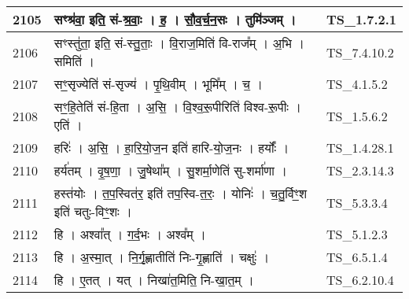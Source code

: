 \documentclass[17pt]{extarticle}
\begin{document}
\begin{longtable}{||p{0.4in}||p{4.9in}||p{0.9in}||}
    \hline
        
    2105 & सꣳश्र॑वा॒ इति॒ सं{-}श्र॒वाः॒   ।   ह॒   ।   सौ॒व॒र्च॒न॒सः   ।   तुमि॑ञ्जम्   ।    & TS\_1.7.2.1       \\
    
    \hline
        
    2106 & सꣳस्तु॑ता॒ इति॒ सं{-}स्तु॒ताः॒   ।   वि॒राज॒मिति॑ वि{-}राज᳚म्   ।   अ॒भि   ।   समिति॑   ।    & TS\_7.4.10.2       \\
    
    \hline
        
    2107 & सꣳ॒॒सृज्येति॑ सं{-}सृज्य॑   ।   पृ॒थि॒वीम्   ।   भूमि᳚म्   ।   च॒   ।    & TS\_4.1.5.2       \\
    
    \hline
        
    2108 & सꣳ॒॒हि॒तेति॑ सं{-}हि॒ता   ।   अ॒सि॒   ।   वि॒श्व॒रू॒पीरिति॑ विश्व{-}रू॒पीः   ।   एति॑   ।    & TS\_1.5.6.2       \\
    
    \hline
        
    2109 & हरिः॑   ।   अ॒सि॒   ।   हा॒रि॒यो॒ज॒न इति॑ हारि{-}यो॒ज॒नः   ।   हर्योः᳚   ।    & TS\_1.4.28.1       \\
    
    \hline
        
    2110 & हर्य॑तम्   ।   वृ॒ष॒णा॒   ।   जु॒षेथा᳚म्   ।   सु॒शर्मा॒णेति॑ सु{-}शर्मा॑णा   ।    & TS\_2.3.14.3       \\
    
    \hline
        
    2111 & हस्त॑योः   ।   त॒प॒स्वित॑र॒ इति॑ तप॒स्वि{-}त॒रः॒   ।   योनिः॑   ।   च॒तु॒र्विꣳ॒॒श इति॑ चतुः{-}विꣳ॒॒शः   ।    & TS\_5.3.3.4       \\
    
    \hline
        
    2112 & हि   ।   अश्वा᳚त्   ।   ग॒र्द॒भः   ।   अश्व᳚म्   ।    & TS\_5.1.2.3       \\
    
    \hline
        
    2113 & हि   ।   अ॒स्मा॒त्   ।   नि॒र्गृ॒ह्णातीति॑ निः{-}गृ॒ह्णाति॑   ।   चक्षुः॑   ।    & TS\_6.5.1.4       \\
    
    \hline
        
    2114 & हि   ।   ए॒तत्   ।   यत्   ।   निखा॑त॒मिति॒ नि{-}खा॒त॒म्   ।    & TS\_6.2.10.4       \\
    

\end{longtable}
\end{document}

